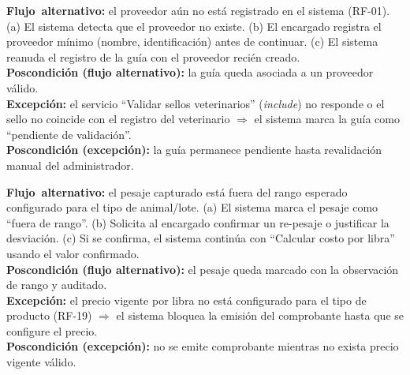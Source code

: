 \documentclass[11pt,a4paper]{article}
\begin{document}
\noindent\textbf{\mbox{Flujo alternativo}:} el proveedor aún no está registrado en el sistema (RF-01). (a) El sistema detecta que el proveedor no existe. (b) El encargado registra el proveedor mínimo (nombre, identificación) antes de continuar. (c) El sistema reanuda el registro de la guía con el proveedor recién creado.\\
\textbf{Poscondición (flujo alternativo):} la guía queda asociada a un proveedor válido.\\
\noindent\textbf{\mbox{Excepción}:} el servicio ``Validar sellos veterinarios'' (\textit{include}) no responde o el sello no coincide con el registro del veterinario $\Rightarrow$ el sistema marca la guía como ``pendiente de validación''.\\
\textbf{Poscondición (excepción):} la guía permanece pendiente hasta revalidación manual del administrador.
\vspace{0.35cm}

\noindent\textbf{\mbox{Flujo alternativo}:} el pesaje capturado está fuera del rango esperado configurado para el tipo de animal/lote. (a) El sistema marca el pesaje como ``fuera de rango''. (b) Solicita al encargado confirmar un re-pesaje o justificar la desviación. (c) Si se confirma, el sistema continúa con ``Calcular costo por libra'' usando el valor confirmado.\\
\textbf{Poscondición (flujo alternativo):} el pesaje queda marcado con la observación de rango y auditado.\\
\noindent\textbf{\mbox{Excepción}:} el precio vigente por libra no está configurado para el tipo de producto (RF-19) $\Rightarrow$ el sistema bloquea la emisión del comprobante hasta que se configure el precio.\\
\textbf{Poscondición (excepción):} no se emite comprobante mientras no exista precio vigente válido.
\vspace{0.35cm}
\end{document}
